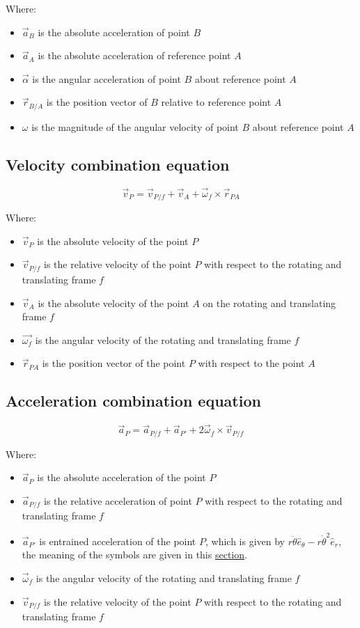 \documentclass[11pt]{article}
\begin{document}
Where:
\begin{itemize}
\item \(\vec{a}_B\) is the absolute acceleration of point \(B\)
\item \(\vec{a}_A\) is the absolute acceleration of reference point \(A\)
\item \(\vec{\alpha}\) is the angular acceleration of point \(B\) about reference point \(A\)
\item \(\vec{r}_{B/A}\) is the position vector of \(B\) relative to reference point \(A\)
\item \(\omega\) is the magnitude of the angular velocity of point \(B\) about reference point \(A\)
\end{itemize}

\subsection{Velocity combination equation}
\label{sec:org1ff1b53}
\[\vec{v}_P = \vec{v}_{P/f} + \vec{v}_A + \vec{\omega}_f \times \vec{r}_{PA}\]

Where:
\begin{itemize}
\item \(\vec{v}_P\) is the absolute velocity of the point \(P\)
\item \(\vec{v}_{P/f}\) is the relative velocity of the point \(P\) with respect to the rotating and translating frame \(f\)
\item \(\vec{v}_A\) is the absolute velocity of the point \(A\) on the rotating and translating frame \(f\)
\item \(\vec{\omega_f}\) is the angular velocity of the rotating and translating frame \(f\)
\item \(\vec{r}_{PA}\) is the position vector of the point \(P\) with respect to the point \(A\)
\end{itemize}

 \newpage

\subsection{Acceleration combination equation}
\label{sec:org2de83ad}
\[\vec{a}_P = \vec{a}_{P/f} + \vec{a}_{P'} + 2 \vec{\omega}_f \times \vec{v}_{P/f}\]

Where:
\begin{itemize}
\item \(\vec{a}_P\) is the absolute acceleration of the point \(P\)
\item \(\vec{a}_{P/f}\) is the relative acceleration of point \(P\) with respect to the rotating and translating frame \(f\)
\item \(\vec{a}_{P'}\) is entrained acceleration of the point \(P\), which is given by \(r \ddot{\theta} \hat{e}_{\theta} - r \dot{\theta}^2 \hat{e}_r\), the meaning of the symbols are given in this \hyperref[org0882e58]{section}.
\item \(\vec{\omega}_f\) is the angular velocity of the rotating and translating frame \(f\)
\item \(\vec{v}_{P/f}\) is the relative velocity of the point \(P\) with respect to the rotating and translating frame \(f\)
\end{itemize}
\end{document}
